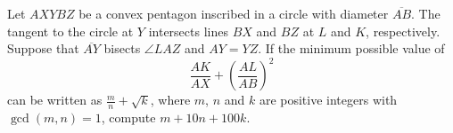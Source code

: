 Let $AXYBZ$ be a convex pentagon inscribed in a circle with diameter $\overline{AB}$.  The tangent to the circle at $Y$ intersects lines $BX$ and $BZ$ at $L$ and $K$, respectively.  Suppose that $\overline{AY}$ bisects $\angle LAZ$ and $AY=YZ$.  If the minimum possible value of \[ \frac{AK}{AX} + \left( \frac{AL}{AB} \right)^2 \] can be written as $\frac{m}{n} + \sqrt{k}$, where $m$, $n$ and $k$ are positive integers with $\gcd(m,n)=1$, compute $m+10n+100k$.
